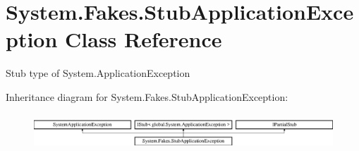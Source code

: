\hypertarget{class_system_1_1_fakes_1_1_stub_application_exception}{\section{System.\-Fakes.\-Stub\-Application\-Exception Class Reference}
\label{class_system_1_1_fakes_1_1_stub_application_exception}
}


Stub type of System.\-Application\-Exception 


Inheritance diagram for System.\-Fakes.\-Stub\-Application\-Exception\-:\begin{figure}[H]
\begin{center}
\leavevmode
\includegraphics[height=1.372549cm]{class_system_1_1_fakes_1_1_stub_application_exception}
\end{center}
\end{figure}
